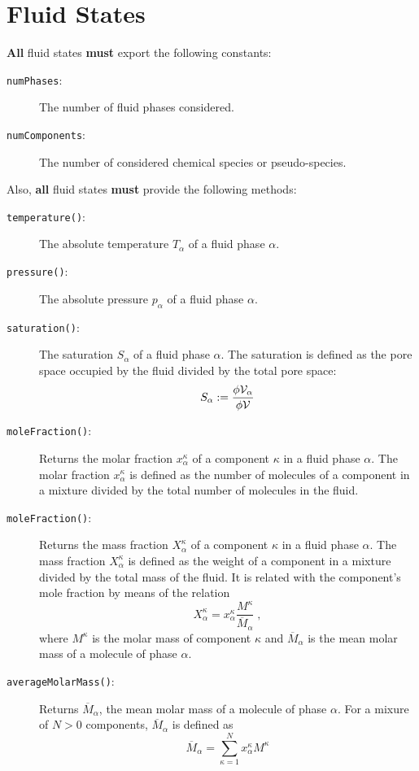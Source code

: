 \section{Fluid States}

{\bf All} fluid states {\bf must} export the following constants:
\begin{description}
\item[\texttt{numPhases}:] The number of fluid phases considered.
\item[\texttt{numComponents}:] The number of considered chemical
  species or pseudo-species.
\end{description}

Also, {\bf all} fluid states {\bf must} provide the following methods:
\begin{description}
\item[\texttt{temperature()}:] The absolute temperature $T_\alpha$ of
  a fluid phase $\alpha$.
\item[\texttt{pressure()}:] The absolute pressure $p_\alpha$ of a
  fluid phase $\alpha$.
\item[\texttt{saturation()}:] The saturation $S_\alpha$ of a fluid 
  phase $\alpha$. The saturation is defined as the pore space occupied by the
  fluid divided by the total pore space:
  \[
  S_\alpha := \frac{\phi \mathcal{V}_\alpha}{\phi \mathcal{V}}
  \]
\item[\texttt{moleFraction()}:] Returns the molar fraction
  $x^\kappa_\alpha$ of a component $\kappa$ in a fluid phase
  $\alpha$. The molar fraction $x^\kappa_\alpha$ is defined as the number
  of molecules of a component in a mixture divided by the total number
  of molecules in the fluid.
\item[\texttt{moleFraction()}:] Returns the mass fraction
  $X^\kappa_\alpha$ of a component $\kappa$ in a fluid phase
  $\alpha$. The mass fraction $X^\kappa_\alpha$ is defined as the
  weight of a component in a mixture divided by the total mass of the
  fluid. It is related with the component's mole fraction by means of
  the relation
  \[
  X^\kappa_\alpha = x^\kappa_\alpha \frac{M^\kappa}{\overline M_\alpha}\;,
  \]
  where $M^\kappa$ is the molar mass of component $\kappa$ and
  $\overline M_\alpha$ is the mean molar mass of a molecule of phase
  $\alpha$.
\item[\texttt{averageMolarMass()}:] Returns $\overline M_\alpha$, the
  mean molar mass of a molecule of phase $\alpha$. For a mixure of $N
  > 0$ components, $\overline M_\alpha$ is defined as
  \[
  \overline M_\alpha = \sum_{\kappa=1}^{N} x^\kappa_\alpha M^\kappa
\]
\end{description}
